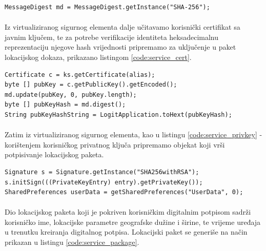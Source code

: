 \begin{code}
\begin{verbatim}
MessageDigest md = MessageDigest.getInstance("SHA-256");
\end{verbatim}
\label{code:service_hash}
\end{code}

\paragraph*{}
Iz virtualiziranog sigurnog elementa dalje učitavamo korisnički certifikat sa javnim ključem, te za potrebe verifikacije identiteta heksadecimalnu reprezentaciju njegove hash vrijednosti pripremamo za uključenje u paket lokacijskog dokaza, prikazano listingom \ref{code:service_cert}.

\begin{code}
\begin{verbatim}
Certificate c = ks.getCertificate(alias);
byte [] pubKey = c.getPublicKey().getEncoded();
md.update(pubKey, 0, pubKey.length);
byte [] pubKeyHash = md.digest();
String pubKeyHashString = LogitApplication.toHext(pubKeyHash);
\end{verbatim}
\label{code:service_cert}
\end{code}

\paragraph*{}
Zatim iz virtualiziranog sigurnog elementa, kao u listingu \ref{code:service_privkey} - korištenjem korisničkog privatnog ključa pripremamo objekat koji vrši potpisivanje lokacijskog paketa.

\begin{code}
\begin{verbatim}
Signature s = Signature.getInstance("SHA256withRSA");
s.initSign(((PrivateKeyEntry) entry).getPrivateKey());
SharedPreferences userData = getSharedPreferences("UserData", 0);
\end{verbatim}
\label{code:service_privkey}
\end{code}

\paragraph*{}
Dio lokacijskog paketa koji je pokriven korisničkim digitalnim potpisom sadrži korisničko ime, lokacijske parametre geografske dužine i širine, te vrijeme uređaja u trenutku kreiranja digitalnog potpisa. Lokacijski paket se generiše na način prikazan u listingu \ref{code:service_package}.

